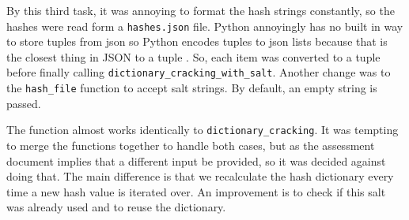By this third task, it was annoying to format the hash strings constantly, so the hashes were read form a \verb|hashes.json| file. Python annoyingly has no built in way to store tuples from json so Python encodes tuples to json lists because that is the closest thing in JSON to a tuple \cite{wikipediaJSON}. So, each item was converted to a tuple before finally calling \verb|dictionary_cracking_with_salt|. Another change was to the \verb|hash_file| function to accept salt strings. By default, an empty string is passed. 

The function almost works identically to \verb|dictionary_cracking|. It was tempting to merge the functions together to handle both cases, but as the assessment document implies that a different input be provided, so it was decided against doing that. The main difference is that we recalculate the hash dictionary every time a new hash value is iterated over. An improvement is to check if this salt was already used and to reuse the dictionary.